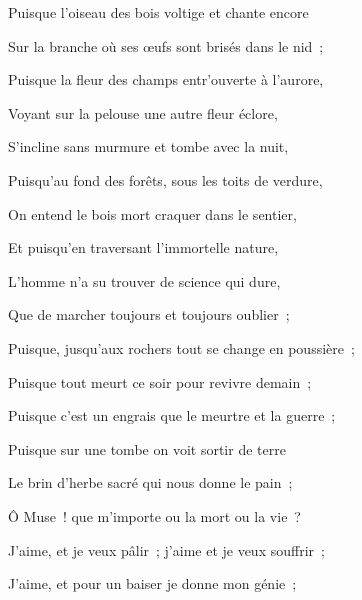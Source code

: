 {\vspace*{-30pt}\par{}

\setlength{\parskip}{0pt}

Puisque l'oiseau des bois voltige et chante encore

Sur la branche où ses œufs sont brisés dans le nid~;

Puisque la fleur des champs entr'ouverte à l'aurore,

Voyant sur la pelouse une autre fleur éclore,

S'incline sans murmure et tombe avec la nuit,

Puisqu'au fond des forêts, sous les toits de verdure,

On entend le bois mort craquer dans le sentier,

Et puisqu'en traversant l'immortelle nature,

L'homme n'a su trouver de science qui dure,

Que de marcher toujours et toujours oublier~;

Puisque, jusqu'aux rochers tout se change en poussière~;

Puisque tout meurt ce soir pour revivre demain~;

Puisque c'est un engrais que le meurtre et la guerre~;

Puisque sur une tombe on voit sortir de terre

Le brin d'herbe sacré qui nous donne le pain~;

Ô Muse~! que m'importe ou la mort ou la vie~?

J'aime, et je veux pâlir~; j'aime et je veux souffrir~;

J'aime, et pour un baiser je donne mon génie~;

}
